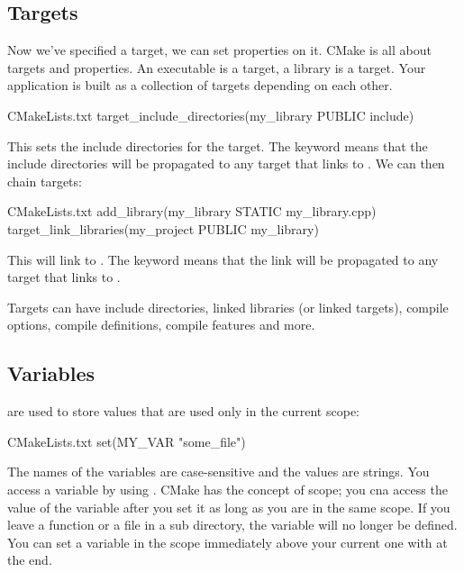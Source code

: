 \subsection{Targets}

Now we've specified a target, we can set properties on it.
CMake is all about targets and properties. An executable is a target, a library is a target. Your
application is built as a collection of targets depending on each other.


\begin{neonlisting}[language=C++]{CMakeLists.txt}
    target_include_directories(my_library PUBLIC include)
\end{neonlisting}

This sets the include directories for the target. The  keyword means that the include directories will be propagated to any target that links to .
We can then chain targets:

\begin{neonlisting}[language=C++]{CMakeLists.txt}
    add_library(my_library STATIC my_library.cpp)
    target_link_libraries(my_project PUBLIC my_library)
\end{neonlisting}

This will link  to . The  keyword means that the link will be propagated to any target that links to .

Targets can have include directories, linked libraries (or linked targets), compile options, compile definitions, 
compile features and more.

\subsection{Variables}

 are used to store values that are used only in the current scope:

\begin{neonlisting}[language=C++]{CMakeLists.txt}
    set(MY_VAR "some_file") 
\end{neonlisting}

The names of the variables are case-sensitive and the values are strings. You access a variable by using \inlinecode{\$\{\}}.
CMake has the concept of scope; you cna access the value of the variable after you set it as long as you are in the same scope. If you leave a function or a file in a sub directory, the variable will 
no longer be defined. You can set a variable in the scope immediately above your current one with  at the end. 

